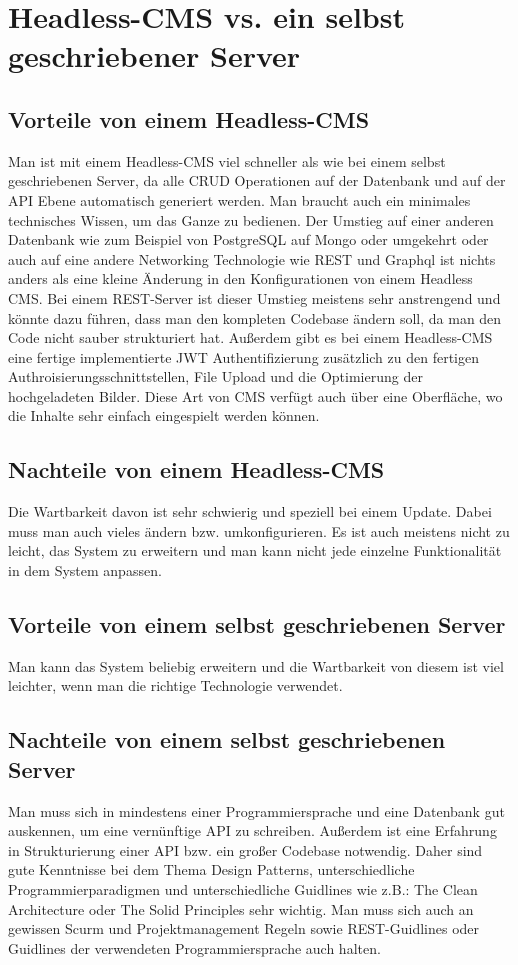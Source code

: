 \section{Headless-CMS vs. ein selbst geschriebener Server}

\subsection{Vorteile von einem Headless-CMS}
Man ist mit einem Headless-CMS viel schneller als wie bei einem selbst geschriebenen Server,
da alle CRUD Operationen auf der Datenbank und auf der API Ebene automatisch generiert werden. Man braucht auch ein minimales technisches Wissen, um das Ganze zu bedienen.
Der Umstieg auf einer anderen Datenbank wie zum Beispiel von PostgreSQL auf Mongo oder umgekehrt
oder auch auf eine andere Networking Technologie wie REST und Graphql
ist nichts anders als eine kleine Änderung in den Konfigurationen von einem Headless CMS.
Bei einem REST-Server ist dieser Umstieg meistens sehr anstrengend und könnte dazu führen,
dass man den kompleten Codebase ändern soll, da man den Code nicht sauber strukturiert hat.
Außerdem gibt es bei einem Headless-CMS eine fertige implementierte JWT Authentifizierung
zusätzlich zu den fertigen Authroisierungsschnittstellen,
File Upload und die Optimierung der hochgeladeten Bilder.
Diese Art von CMS verfügt auch über eine Oberfläche,
wo die Inhalte sehr einfach eingespielt werden können.

\subsection{Nachteile von einem Headless-CMS}

Die Wartbarkeit davon ist sehr schwierig und speziell bei einem Update. Dabei muss man auch vieles ändern bzw. umkonfigurieren.
Es ist auch meistens nicht zu leicht, das System zu erweitern und man kann nicht jede einzelne Funktionalität in dem System anpassen.

\subsection{Vorteile von einem selbst geschriebenen Server}
Man kann das System beliebig erweitern und die Wartbarkeit von diesem ist viel leichter, wenn man die richtige Technologie verwendet.

\subsection{Nachteile von einem selbst geschriebenen Server}
Man muss sich in mindestens einer Programmiersprache und eine Datenbank gut auskennen,
um eine vernünftige API zu schreiben.
Außerdem ist eine Erfahrung in Strukturierung einer API bzw. ein großer Codebase notwendig.
Daher sind gute Kenntnisse bei dem Thema Design Patterns, unterschiedliche Programmierparadigmen und unterschiedliche Guidlines wie z.B.: The Clean Architecture oder The Solid Principles sehr wichtig. Man muss sich auch an gewissen Scurm und Projektmanagement Regeln sowie REST-Guidlines oder Guidlines der verwendeten Programmiersprache auch halten.


